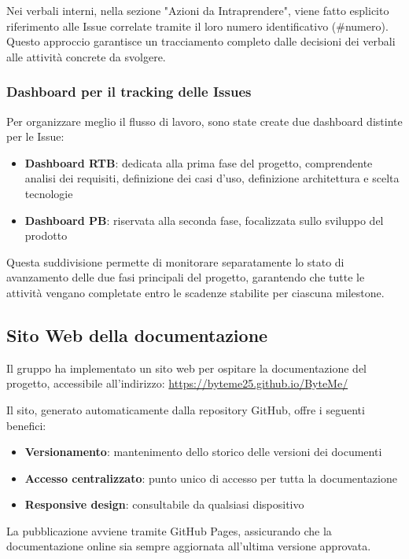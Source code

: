 \documentclass[11pt,a4paper]{article}
\begin{document}
Nei verbali interni, nella sezione "Azioni da Intraprendere", viene fatto esplicito riferimento alle Issue correlate tramite il loro numero identificativo (\#numero). Questo approccio garantisce un tracciamento completo dalle decisioni dei verbali alle attività concrete da svolgere.


\subsubsection{Dashboard per il tracking delle Issues}
Per organizzare meglio il flusso di lavoro, sono state create due dashboard distinte per le Issue:
\begin{itemize}
    \item \textbf{Dashboard RTB}: dedicata alla prima fase del progetto, comprendente analisi dei requisiti, definizione dei casi d'uso, definizione architettura e scelta tecnologie
    
    \item \textbf{Dashboard PB}: riservata alla seconda fase, focalizzata sullo sviluppo del prodotto
\end{itemize}

Questa suddivisione permette di monitorare separatamente lo stato di avanzamento delle due fasi principali del progetto, garantendo che tutte le attività vengano completate entro le scadenze stabilite per ciascuna milestone.


\subsection{Sito Web della documentazione}
Il gruppo ha implementato un sito web per ospitare la documentazione del progetto, accessibile all'indirizzo: \url{https://byteme25.github.io/ByteMe/}

Il sito, generato automaticamente dalla repository GitHub, offre i seguenti benefici:
\begin{itemize}
    \item \textbf{Versionamento}: mantenimento dello storico delle versioni dei documenti
    \item \textbf{Accesso centralizzato}: punto unico di accesso per tutta la documentazione
    \item \textbf{Responsive design}: consultabile da qualsiasi dispositivo
\end{itemize}

La pubblicazione avviene tramite GitHub Pages, assicurando che la documentazione online sia sempre aggiornata all'ultima versione approvata.
\end{document}
